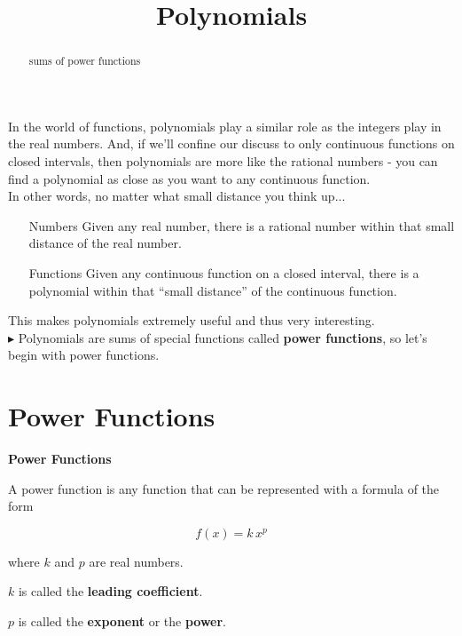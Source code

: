 \documentclass{ximera}
\title{Polynomials}
\begin{document}
\begin{abstract}
sums of power functions
\end{abstract}
\maketitle


In the world of functions, polynomials play a similar role as the integers play in the real numbers. And, if we'll confine our discuss to only continuous functions on closed intervals, then polynomials are more like the rational numbers - you can find a polynomial as close as you want to any continuous function. \\


In other words, no matter what small distance you think up...

\begin{itemize}
\item [Numbers] Given any real number, there is a rational number within that small distance of the real number.

\item [Functions] Given any continuous function on a closed interval, there is a polynomial within that ``small distance'' of the continuous function.
\end{itemize}

This makes polynomials extremely useful and thus very interesting. \\


$\blacktriangleright$ Polynomials are sums of special functions called \textbf{power functions}, so let's begin with power functions.













\section{Power Functions}

\begin{definition} \textbf{\textcolor{green!50!black}{Power Functions}}

A power function is any function that can be represented with a formula of the form

\[   f(x) = k \, x^p      \]

where $k$ and $p$ are real numbers.

$k$ is called the \textbf{leading coefficient}.

$p$ is called the \textbf{exponent} or the \textbf{power}.


\end{definition}
\end{document}
